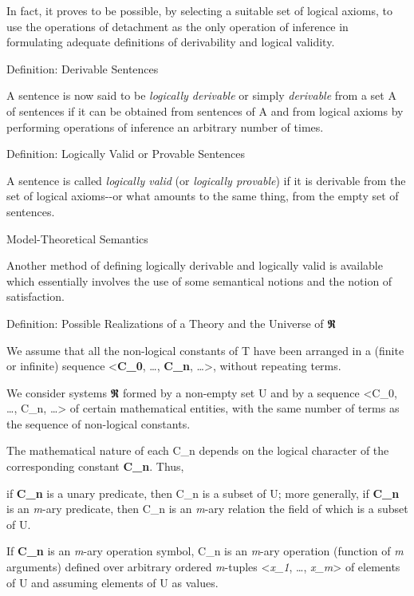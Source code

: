 In fact, it proves to be possible, by selecting a suitable set of
logical axioms, to use the operations of detachment as the only
operation of inference in formulating adequate definitions of
derivability and logical validity.

\protect\hypertarget{anchor-13}{}{}Definition: Derivable Sentences

A sentence is now said to be \emph{logically derivable} or simply
\emph{derivable} from a set A of sentences if it can be obtained from
sentences of A and from logical axioms by performing operations of
inference an arbitrary number of times.

\protect\hypertarget{anchor-14}{}{}Definition: Logically Valid or
Provable Sentences

A sentence is called \emph{logically valid} (or \emph{logically
provable}) if it is derivable from the set of logical axioms-\/-or what
amounts to the same thing, from the empty set of sentences.

\protect\hypertarget{anchor-15}{}{}Model-Theoretical Semantics

Another method of defining logically derivable and logically valid is
available which essentially involves the use of some semantical notions
and the notion of satisfaction.

\protect\hypertarget{anchor-16}{}{}Definition: Possible Realizations of
a Theory and the Universe of 𝕽

We assume that all the non-logical constants of T have been arranged in
a (finite or infinite) sequence \textless{}\textbf{C\_0}, \ldots,
\textbf{C\_n}, \ldots\textgreater, without repeating terms.

We consider systems 𝕽 formed by a non-empty set U and by a sequence
\textless C\_0, \ldots, C\_n, \ldots\textgreater{} of certain
mathematical entities, with the same number of terms as the sequence of
non-logical constants.

The mathematical nature of each C\_n depends on the logical character of
the corresponding constant \textbf{C\_n}. Thus,

if \textbf{C\_n} is a unary predicate, then C\_n is a subset of U; more
generally, if \textbf{C\_n} is an \emph{m}-ary predicate, then C\_n is
an \emph{m}-ary relation the field of which is a subset of U.

If \textbf{C\_n} is an \emph{m}-ary operation symbol, C\_n is an
\emph{m}-ary operation (function of \emph{m} arguments) defined over
arbitrary ordered \emph{m}-tuples \textless{}\emph{x\_1}, \ldots,
\emph{x\_m}\textgreater{} of elements of U and assuming elements of U as
values.

